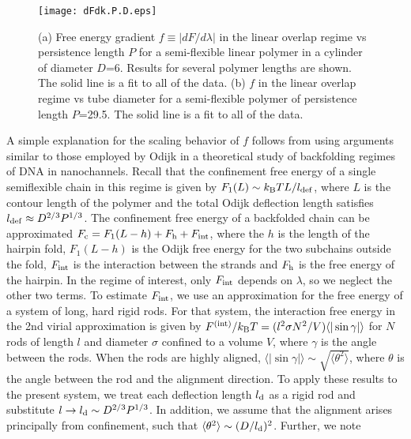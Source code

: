 \documentclass[journal=mamobx,manuscript=article,layout=twocolumn]{achemso}
\begin{document}
\begin{figure}[!ht]
\begin{center}
\texttt{[image: dFdk.P.D.eps]}
\end{center}
\caption{
(a) Free energy gradient $f \equiv |dF/d\lambda|$ in the linear overlap regime vs persistence 
length $P$ for a semi-flexible linear polymer in a cylinder of diameter $D$=6. Results for
several polymer lengths are shown. The solid line is a fit to all of the data.
(b) $f$ in the linear overlap regime vs tube diameter for a semi-flexible
polymer of persistence length $P$=29.5. The solid line is a fit to all of the data.}
\label{dFdk.P.D6}
\end{figure}

A simple explanation for the scaling behavior of $f$ follows from using
arguments similar to those employed by Odijk in a theoretical study of backfolding 
regimes of DNA in nanochannels.\cite{odijk2008scaling} Recall that the confinement 
free energy of a single semiflexible chain in this regime is given by 
$F_1(L) \sim k_{\rm B}T L/l_{\rm def}$, where $L$ is the contour length of the polymer and
the total Odijk deflection length satisfies $l_{\rm def} \approx D^{2/3}P^{1/3}$. 
The confinement free energy of a backfolded chain can be approximated
$F_{\rm c} = F_1(L-h) + F_{\rm h} + F_{\rm int}$, where the $h$ is the length
of the hairpin fold, $F_1(L-h)$ is the Odijk free energy for the two subchains
outside the fold, $F_{\rm int}$ is the interaction between the strands and
$F_{\rm h}$ is the free energy of the hairpin. In the regime of interest,
only $F_{\rm int}$ depends on $\lambda$, so we neglect the other two terms.
To estimate $F_{\rm int}$, we use an approximation for the free energy of a system
of long, hard rigid rods. For that system, the interaction free energy 
in the 2nd virial approximation is given by $F^{\rm (int)}/k_{\rm B}T = (l^2\sigma N^2/V)
\langle |\sin\gamma|\rangle$ for $N$ rods of length $l$ and diameter $\sigma$ confined
to a volume $V$, where $\gamma$ is the angle between the rods.\cite{odijk1986theory}
When the rods are highly aligned, $\langle|\sin\gamma|\rangle \sim \sqrt{\langle\theta^2\rangle}$,
where $\theta$ is the angle between the rod and the alignment direction. To apply these
results to the present system, we treat each deflection length $l_{\rm d}$ as a rigid 
rod and substitute $l\rightarrow l_{\rm d}\sim D^{2/3}P^{1/3}$. In addition,
we assume that the alignment arises principally from confinement, such that
$\langle\theta^2\rangle \sim (D/l_{\rm d})^2$.  Further, we note
\end{document}
